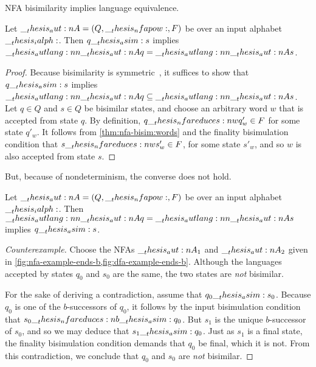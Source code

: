 \Ac{NFA} bisimilarity implies language equivalence.
%
\begin{theorem}
  Let $\__thesis_aut:n {A} = (Q, \__thesis_nfapow:, F)$ be  over an input alphabet $\__thesis_ialph:$.
  Then $q \__thesis_asim: s$ implies $\__thesis_autlang:nn {\__thesis_aut:n {A}} {q} = \__thesis_autlang:nn {\__thesis_aut:n {A}} {s}$.
\end{theorem}
%
\begin{proof}
  Because bisimilarity is symmetric~, it suffices to show that $q \__thesis_asim: s$ implies $\__thesis_autlang:nn {\__thesis_aut:n {A}} {q} \subseteq \__thesis_autlang:nn {\__thesis_aut:n {A}} {s}$.
  Let $q \in Q$ and $s \in Q$ be bisimilar states, and choose an arbitrary word $w$ that is accepted from state $q$.
  By definition, $q \nfareduces[w] q'_w \in F$ for some state $q'_w$.
  It follows from \cref{thm:nfa-bisim:words} and the finality bisimulation condition that $s \nfareduces[w] s'_w \in F$, for some state $s'_w$, and so $w$ is also accepted from state $s$.
\end{proof}

But, because of nondeterminism, the converse does not hold.
\begin{falseclaim}
  Let $\__thesis_aut:n {A} = (Q, \__thesis_nfapow:, F)$ be  over an input alphabet $\__thesis_ialph:$.
  Then $\__thesis_autlang:nn {\__thesis_aut:n {A}} {q} = \__thesis_autlang:nn {\__thesis_aut:n {A}} {s}$ implies $q \__thesis_asim: s$.
\end{falseclaim}
%
\begin{proof}[Counterexample]
  Choose the \acp{NFA} $\__thesis_aut:n {A}_1$ and $\__thesis_aut:n {A}_2$ given in \cref{fig:nfa-example-ends-b,fig:dfa-example-ends-b}.
  Although the languages accepted by states $q_0$ and $s_0$ are the same, the two states are \emph{not} bisimilar.

  For the sake of deriving a contradiction, assume that $q_0 \__thesis_asim: s_0$.
  Because $q_0$ is one of the $b$-successors of $q_0$, it follows by the input bisimulation condition that $s_0 \nfareduces[\smash{b}]\asim q_0$.
  But $s_1$ is the unique $b$-successor of $s_0$, and so we may deduce that $s_1 \__thesis_asim: q_0$.
  Just as $s_1$ is a final state, the finality bisimulation condition demands that $q_0$ be final, which it is not.
  From this contradiction, we conclude that $q_0$ and $s_0$ are \emph{not} bisimilar. 
\end{proof}

